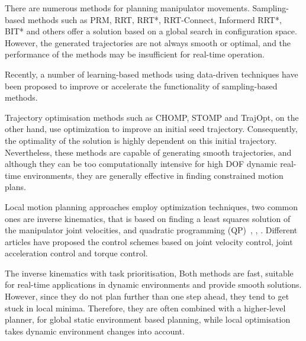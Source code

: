 \documentclass[letterpaper, 10 pt, conference]{ieeeconf}  %
\begin{document}
There are numerous methods for planning manipulator movements. Sampling-based methods such as PRM, RRT, RRT*, RRT-Connect, Informerd RRT*, BIT* and others offer a solution based on a global search in configuration space. However, the generated trajectories are not always smooth or optimal, and the performance of the methods may be insufficient for real-time operation. 

Recently, a number of learning-based methods using data-driven techniques have been proposed to improve or accelerate the functionality of sampling-based methods.  

Trajectory optimisation methods such as CHOMP, STOMP and TrajOpt, on the other hand, use optimization to improve an initial seed trajectory. Consequently, the optimality of the solution is highly dependent on this initial trajectory. Nevertheless, these methods are capable of generating smooth trajectories, and although they can be too computationally intensive for high DOF dynamic real-time environments, they are generally effective in finding constrained motion plans. 

Local motion planning approaches employ optimization techniques, two common ones are inverse kinematics, that is based on finding a least squares solution of the manipulator joint velocities, and quadratic programming (QP)~\cite{c21}, \cite{c22}, \cite{c23}. Different articles have proposed the control schemes based on joint velocity control, joint acceleration control and torque control. 


 The inverse kinematics with task prioritisation,  Both methods are fast, suitable for real-time applications in dynamic environments and provide smooth solutions. However, since they do not plan further than one step ahead, they tend to get stuck in local minima. Therefore, they are often combined with a higher-level planner, for global static environment based  planning, while local optimisation takes dynamic environment changes into account.



\end{document}
